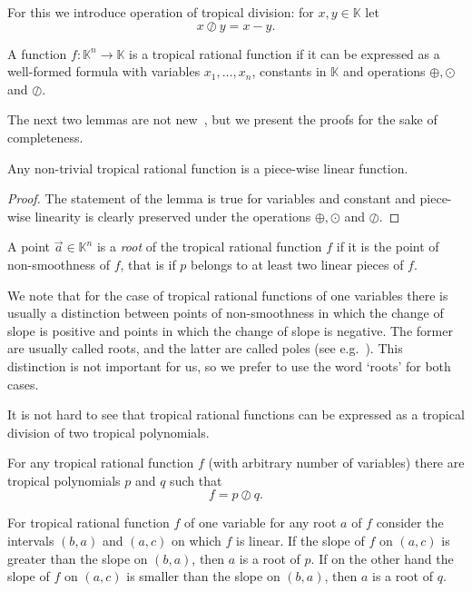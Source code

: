 \documentclass[11pt]{article}
\newcommand{\ta}{\oplus}
\newcommand{\tp}{\odot}
\newcommand{\td}{\oslash}
\newcommand{\bb}[1]{\mathbb{#1}}
\begin{document}
For this we introduce operation of tropical division: for $x, y \in \bb{K}$ let
$$
x \td y= x-y.
$$

\begin{definition}
A function $f\colon \bb{K}^n \to \bb{K}$ is a tropical rational function if it can be expressed as a well-formed formula with variables $x_1,\ldots, x_n$, constants in $\bb{K}$ and operations $\ta, \tp$ and $\td$.
\end{definition}

The next two lemmas are not new~\cite{CuninghameG80,Ovchinnikov02}, but we present the proofs for the sake of completeness.
\begin{lemma} \label{lem:rational_simple}
Any non-trivial tropical rational function is a piece-wise linear function.
\end{lemma}

\begin{proof}
The statement of the lemma is true for variables and constant and piece-wise linearity is clearly preserved under the operations $\ta, \tp$ and $\td$.
\end{proof}

A point $\vec{a}\in \bb{K}^n$ is a \emph{root} of the tropical rational function $f$ if it is the point of non-smoothness of $f$, that is if $p$ belongs to at least two linear pieces of $f$.

\begin{remark}
We note that for the case of tropical rational functions of one variables there is usually a distinction between points of non-smoothness in which the change of slope
is positive and points in which the change of slope is negative. The former are usually called roots, and the latter are called poles (see e.g.~\cite{HalburdS09}). This distinction is not important for us, so we prefer to use the word `roots' for both cases.
\end{remark}

It is not hard to see that tropical rational functions can be expressed as a tropical division of two tropical polynomials.

\begin{lemma} \label{lem:rational_normal_form}
For any tropical rational function $f$ (with arbitrary number of variables) there are tropical polynomials $p$ and $q$ such that
$$
f = p \td q.
$$

For tropical rational function $f$ of one variable for any root $a$ of $f$ consider the intervals $(b,a)$ and $(a,c)$ on which $f$ is linear. If the slope of $f$ on $(a,c)$ is greater than the slope on $(b,a)$, then $a$ is a root of $p$. If on the other hand the slope of $f$ on $(a,c)$ is smaller than the slope on $(b,a)$, then $a$ is a root of $q$.
\end{lemma}
\end{document}
